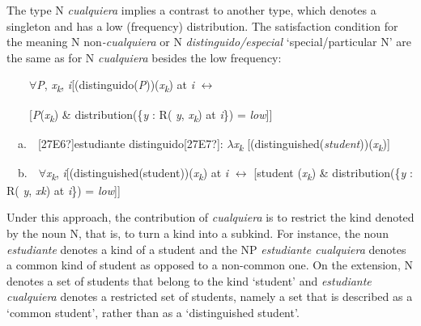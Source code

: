 \begin{styleStandard}
The type N \textit{cualquiera} implies a contrast to another type, which denotes a singleton and has a low (frequency) distribution. The satisfaction condition for the meaning N non\textit{{}-cualquiera }or N \textit{distinguido/especial} ‘special/particular N’ are the same as for N \textit{cualquiera} besides the low frequency:
\end{styleStandard}

\begin{styleStandard}
\ \ \ \ ${\forall}$\textit{P}, \textit{x}\textit{\textsubscript{k}}, \textit{i}[(distinguido(\textit{P}))(\textit{x}\textit{\textsubscript{k}}) at \textit{i }$\leftrightarrow $
\end{styleStandard}

\begin{styleStandard}
\ \ \ \ [\textit{P}(\textit{x}\textit{\textsubscript{k}}) \& distribution(\{\textit{y }: R( \textit{y}, \textit{x}\textit{\textsubscript{k}}) at \textit{i}\}) = \textit{low}]]
\end{styleStandard}

\begin{styleStandard}
\ \ a.\ \ [27E6?]estudiante distinguido[27E7?]: $\lambda $\textit{x}\textit{\textsubscript{k}} [(distinguished(\textit{student}))(\textit{x}\textit{\textsubscript{k}})]
\end{styleStandard}

\begin{styleStandard}
\ \ b.\ \ ${\forall}$\textit{x}\textit{\textsubscript{k}}, \textit{i}[(distinguished(student))(\textit{x}\textit{\textsubscript{k}}) at \textit{i }$\leftrightarrow $ [student (\textit{x}\textit{\textsubscript{k}}) \& distribution(\{\textit{y }: R( \textit{y}, \textit{xk}) at \textit{i}\}) = \textit{low}]]
\end{styleStandard}

\begin{styleStandard}
Under this approach, the contribution of \textit{cualquiera} is to restrict the kind denoted by the noun N, that is, to turn a kind into a subkind. For instance, the noun \textit{estudiante} denotes a kind of a student and the NP \textit{estudiante cualquiera} denotes a common kind of student as opposed to a non-common one. On the extension, N denotes a set of students that belong to the kind ‘student’ and \textit{estudiante cualquiera} denotes a restricted set of students, namely a set that is described as a ‘common student’, rather than as a ‘distinguished student’. 
\end{styleStandard}

